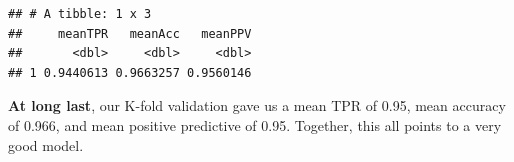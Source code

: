 \documentclass[]{article}
\newenvironment{Shaded}{\begin{snugshade}}{\end{snugshade}}
\newcommand{\KeywordTok}[1]{\textcolor[rgb]{0.13,0.29,0.53}{\textbf{#1}}}
\newcommand{\DataTypeTok}[1]{\textcolor[rgb]{0.13,0.29,0.53}{#1}}
\newcommand{\StringTok}[1]{\textcolor[rgb]{0.31,0.60,0.02}{#1}}
\newcommand{\OperatorTok}[1]{\textcolor[rgb]{0.81,0.36,0.00}{\textbf{#1}}}
\newcommand{\NormalTok}[1]{#1}
\begin{document}
\begin{Shaded}
\end{Shaded}

\begin{verbatim}
## # A tibble: 1 x 3
##     meanTPR   meanAcc   meanPPV
##       <dbl>     <dbl>     <dbl>
## 1 0.9440613 0.9663257 0.9560146
\end{verbatim}

\textbf{At long last}, our K-fold validation gave us a mean TPR of 0.95,
mean accuracy of 0.966, and mean positive predictive of 0.95. Together,
this all points to a very good model.
\end{document}
